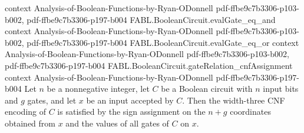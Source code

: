 \begin{theorem}
  {context}
  {Analysis-of-Boolean-Functions-by-Ryan-ODonnell}
  {pdf-ffbe9c7b3306-p103-b002,
    pdf-ffbe9c7b3306-p197-b004}
\proofstep
  {FABL.BooleanCircuit.evalGate_eq_and}
  {context}
  {Analysis-of-Boolean-Functions-by-Ryan-ODonnell}
  {pdf-ffbe9c7b3306-p103-b002,
    pdf-ffbe9c7b3306-p197-b004}
\proofstep
  {FABL.BooleanCircuit.evalGate_eq_or}
  {context}
  {Analysis-of-Boolean-Functions-by-Ryan-ODonnell}
  {pdf-ffbe9c7b3306-p103-b002,
    pdf-ffbe9c7b3306-p197-b004}
\proofstep
  {FABL.BooleanCircuit.gateRelation_cnfAssignment}
  {context}
  {Analysis-of-Boolean-Functions-by-Ryan-ODonnell}
  {pdf-ffbe9c7b3306-p197-b004}
Let $n$ be a nonnegative integer, let $C$ be a Boolean circuit with $n$ input bits and
$g$ gates, and let $x$ be an input accepted by $C$. Then the width-three CNF encoding of
$C$ is satisfied by the sign assignment on the $n+g$ coordinates obtained from $x$ and
the values of all gates of $C$ on $x$.
\end{theorem}

